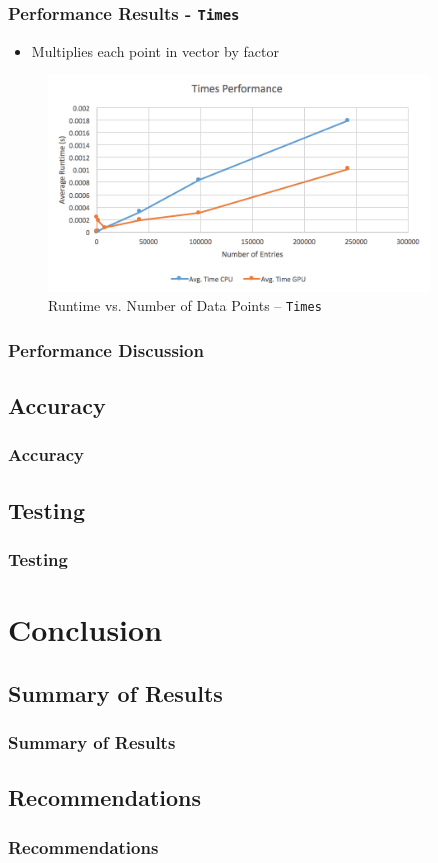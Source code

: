 \documentclass{beamer}
\begin{document}
\begin{frame}
\frametitle{Performance Results - \texttt{Times}}
\begin{itemize}
\item Multiplies each point in vector by factor
\end{itemize}
\begin{figure}
\centering
\includegraphics[width=0.9\textwidth]{images/times_line.png}
\caption{Runtime vs. Number of Data Points -- \texttt{Times}}
\end{figure}
\end{frame}

\begin{frame}
\frametitle{Performance Discussion}
\end{frame}

\subsection{Accuracy}
\begin{frame}
\frametitle{Accuracy}
\end{frame}

\subsection{Testing}
\begin{frame}
\frametitle{Testing}
\end{frame}

\section{Conclusion}
\subsection{Summary of Results}
\begin{frame}
\frametitle{Summary of Results}
\end{frame}

\subsection{Recommendations}
\begin{frame}
\frametitle{Recommendations}
\end{frame}
\end{document}
